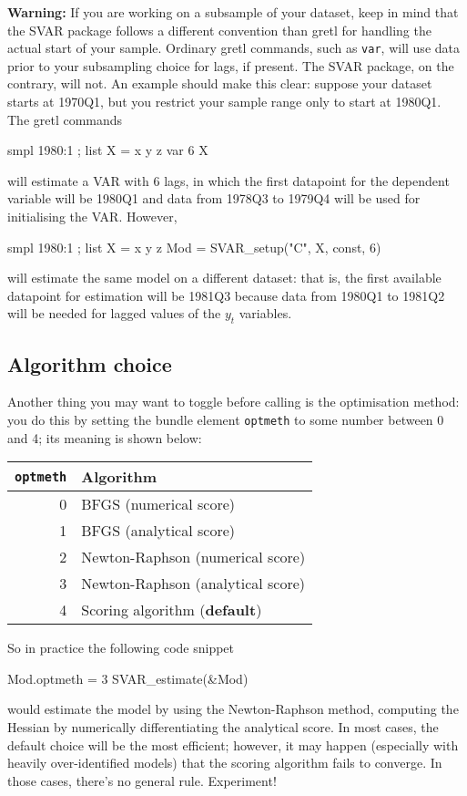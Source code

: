 \documentclass[a4paper,10pt]{article}
\newcommand{\app}[1]{\textsf{#1}}
\newcommand{\cmd}[1]{\texttt{#1}}
\newcommand{\dtk}[1]{\texttt{\detokenize{#1}}}
\begin{document}
\textbf {Warning:} If you are working on a subsample of your dataset,
keep in mind that the SVAR package follows a different convention than
\app{gretl} for handling the actual start of your sample. Ordinary
\app{gretl} commands, such as \cmd{var}, will use data prior to your
subsampling choice for lags, if present. The SVAR package, on the
contrary, will not. An example should make this clear: suppose your
dataset starts at 1970Q1, but you restrict your sample range only to
start at 1980Q1. The \app{gretl} commands
\begin{code}
  smpl 1980:1 ;
  list X = x y z
  var 6 X
\end{code}
will estimate a VAR with 6 lags, in which the first datapoint for the
dependent variable will be 1980Q1 and data from 1978Q3 to 1979Q4 will
be used for initialising the VAR. However,
\begin{code}
  smpl 1980:1 ;
  list X = x y z
  Mod = SVAR_setup("C", X, const, 6)
\end{code}
will estimate the same model on a different dataset: that is, the first
available datapoint for estimation will be 1981Q3 because data from
1980Q1 to 1981Q2 will be needed for lagged values of the $y_t$ variables.

\subsection{Algorithm choice}
\label{sec:algorithms}

Another thing you may want to toggle before calling
\dtk{SVAR_estimate} is the optimisation method: you do this by
setting the bundle element \texttt{optmeth} to some number between 0
and 4; its meaning is shown below:

\begin{center}
  \begin{tabular}{rl}
    \hline
    \texttt{optmeth} & Algorithm \\
    \hline
	0 & BFGS (numerical score) \\
	1 & BFGS (analytical score) \\
	2 & Newton-Raphson (numerical score) \\
	3 & Newton-Raphson (analytical score) \\
	4 & Scoring algorithm (\textbf{default}) \\
    \hline
  \end{tabular}
\end{center}

So in practice the following code snippet
\begin{code}
  Mod.optmeth = 3
  SVAR_estimate(&Mod)
\end{code}
would estimate the model by using the Newton-Raphson method, computing
the Hessian by numerically differentiating the analytical score. In
most cases, the default choice will be the most efficient; however, it
may happen (especially with heavily over-identified models) that the
scoring algorithm fails to converge. In those cases, there's no
general rule. Experiment!
\end{document}
